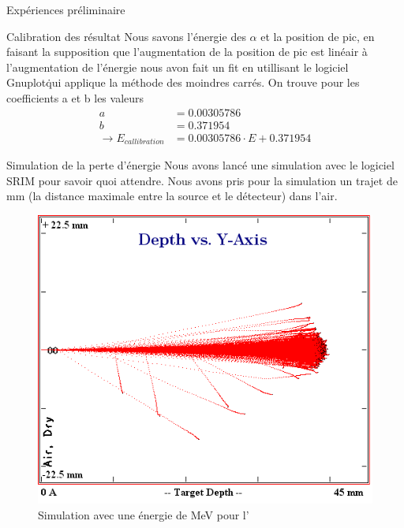 \documentclass[a4paper,11pt]{scrartcl}
\begin{document}
\begin{section}{Expériences préliminaire}
\begin{subsection}{Calibration des résultat}
   Nous savons l'énergie des $\alpha$ et la position de pic, en faisant la supposition que l'augmentation de la position de pic est linéair à l'augmentation de l'énergie nous avon fait un fit en utillisant le logiciel \flqq Gnuplot\frqq\. qui applique la méthode des moindres carrés. On trouve pour les coefficients a et b les valeurs
   \begin{align*}
    a&= 0.00305786 \\
    b&= 0.371954 \\
    \rightarrow E_{callibration} &= 0.00305786  \cdot E +0.371954 
   \end{align*}
  \end{subsection}

  \begin{subsection}{Simulation de la perte d'énergie}
   Nous avons lancé une simulation avec le logiciel \flqq SRIM \frqq pour savoir quoi attendre. Nous avons pris pour la simulation un trajet de \unit[45]{mm} (la distance maximale entre la source et le détecteur) dans l'air.
   \begin{figure}[H]
    \begin{minipage}{0.45\textwidth}
     \includegraphics[width=\textwidth]{Bilder/simam.png}
     \caption{Simulation avec une énergie de \unit[5]{MeV} pour l'}
    \end{minipage}
    \hfill
    \begin{minipage}{0.45\textwidth}

\end{minipage}
\end{figure}
\end{subsection}
\end{section}
\end{document}
